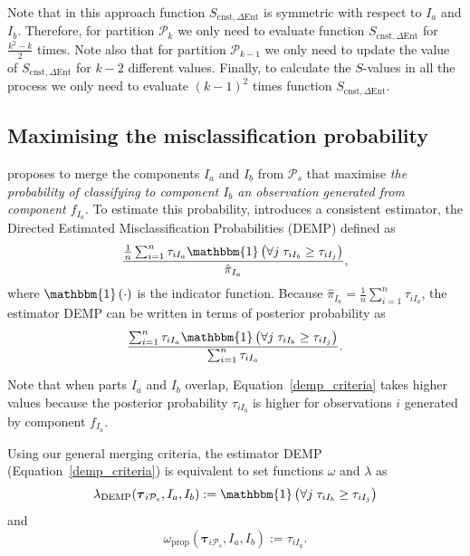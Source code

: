 \documentclass[submit]{smj}
\theoremstyle{definition}
\newcommand{\m}[1]{\boldsymbol{#1}}
\begin{document}
Note that in this approach function $S_{\text{cnst}, \Delta\text{Ent}}$ is symmetric with respect to $I_a$ and $I_b$. Therefore, for partition $\mathcal{P}_k$ we only need to evaluate function $S_{\text{cnst}, \Delta\text{Ent}}$ for $\frac{k^2-k}{2}$ times. Note also that for partition $\mathcal{P}_{k-1}$ we only need to update the value of $S_{\text{cnst}, \Delta\text{Ent}}$ for $k-2$ different values. Finally, to calculate the $S$-values in all the process we only need to evaluate $(k-1)^2$ times function $S_{\text{cnst}, \Delta\text{Ent}}$. 

\subsection{Maximising the misclassification probability}
\label{missclassification_section}

\cite{hennig2010methods} proposes to merge the components $I_a$ and $I_b$ from $ \mathcal{P}_s$ that maximise \emph{the probability of classifying to component $I_b$ an observation generated from component $f_{I_a}$}. To estimate this probability,  \cite{hennig2010methods} introduces a consistent estimator, the Directed Estimated Misclassification Probabilities (DEMP) defined as
\[
\frac{ \frac{1}{n} \sum_{i=1}^n {\tau_{iI_a} \mathbbm{1}\left( \forall j\; \tau_{i I_{b}} \geq \tau_{iI_j} \right)}}{ \hat{\pi}_{I_a}},
\]
where $\mathbbm{1}\left( \cdot \right)$ is the indicator function. Because $ \hat{\pi}_{I_a} = \frac{1}{n} \sum_{i=1}^n \tau_{iI_a}$, the estimator DEMP can be written in terms of posterior probability as
\begin{equation}\label{demp_criteria}
\frac{ \sum_{i=1}^n {\tau_{iI_a} \mathbbm{1}\left( \forall j\; \tau_{i I_{b}} \geq \tau_{iI_j} \right)}}{\sum_{i=1}^n \tau_{iI_a} }.
\end{equation}

Note that when parts $I_a$ and $I_b$ overlap, Equation~\ref{demp_criteria} takes higher values because the posterior probability $\tau_{i I_b}$ is higher for observations $i$ generated by component $f_{I_a}$.

Using our general merging criteria, the estimator DEMP (Equation~\ref{demp_criteria}) is equivalent to set functions $\omega$ and $\lambda$ as 
\begin{equation}\label{lambda_demp}
\lambda_{\text{DEMP}}(\m\tau_{i \mathcal{P}_s},  I_a,  I_b) := \mathbbm{1}\left( \forall j\; \tau_{i I_{b}} \geq \tau_{iI_j} \right)
\end{equation}
and
\[
\omega_{\text{prop}}(\m\tau_{i \mathcal{P}_s},  I_a,  I_b) :=  \tau_{iI_a}.
\]
\end{document}

